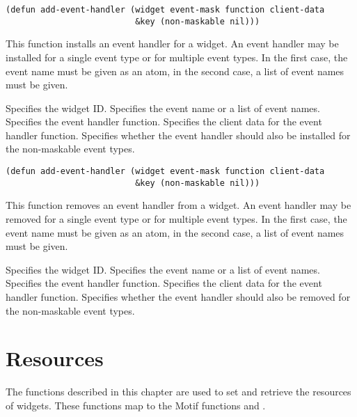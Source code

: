 \begin{lispd}
\syntax\begin{verbatim}
(defun add-event-handler (widget event-mask function client-data 
                          &key (non-maskable nil)))
\end{verbatim}
\beschr This function installs an event handler for a widget.
An event handler may be installed for a single event type or for multiple event
types. In the first case, the event name must be given as an atom, in the 
second case, a list of event names must be given.
\parameter
\begin{paramd}
 Specifies the widget ID.
 Specifies the event name or a list of event names.
 Specifies the event handler function.
 Specifies the client data for the event handler function.
 Specifies whether the event handler should also be 
installed for the non-maskable event types.
\end{paramd}
\end{lispd}

\begin{lispd}
\syntax\begin{verbatim}
(defun add-event-handler (widget event-mask function client-data 
                          &key (non-maskable nil)))
\end{verbatim}
\beschr This function removes an event handler from a widget.
An event handler may be removed for a single event type or for multiple event
types. In the first case, the event name must be given as an atom, in the 
second case, a list of event names must be given.
\parameter
\begin{paramd}
 Specifies the widget ID.
 Specifies the event name or a list of event names.
 Specifies the event handler function.
 Specifies the client data for the event handler function.
 Specifies whether the event handler should also be 
removed for the non-maskable event types.
\end{paramd}
\end{lispd}

\chapter{Resources} \label{sec:resources}

The functions described in this chapter are used to set and retrieve the
resources of widgets. These functions map to the Motif functions 
 and .


